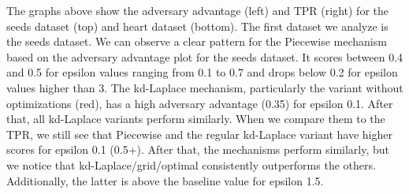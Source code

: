 {\begin{figure}[H]
\begin{minipage}[c]{1.1\textwidth}
      \label{fig:privacy_heart-dataset_comparison_3d_aa_plot}
    \end{minipage}
  \end{figure}
  The graphs above show the adversary advantage (left) and TPR (right) for the seeds dataset (top) and heart dataset (bottom).
  The first dataset we analyze is the seeds dataset. We can observe a clear pattern for the Piecewise mechanism based on the adversary advantage plot for the seeds dataset. It scores between 0.4 and 0.5 for epsilon values ranging from 0.1 to 0.7 and drops below 0.2 for epsilon values higher than 3.
  The kd-Laplace mechanism, particularly the variant without optimizations (red), has a high adversary advantage (0.35) for epsilon 0.1. After that, all kd-Laplace variants perform similarly. When we compare them to the TPR, we still see that Piecewise and the regular kd-Laplace variant have higher scores for epsilon 0.1 (0.5+). After that, the mechanisms perform similarly, but we notice that kd-Laplace/grid/optimal consistently outperforms the others. Additionally, the latter is above the baseline value for epsilon 1.5.

}
